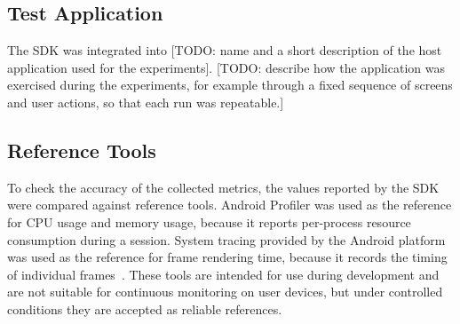 
\subsection{Test Application}

The SDK was integrated into [TODO: name and a short description of the host application used for the experiments]. [TODO: describe how the application was exercised during the experiments, for example through a fixed sequence of screens and user actions, so that each run was repeatable.]


\subsection{Reference Tools}

To check the accuracy of the collected metrics, the values reported by the SDK were compared against reference tools. Android Profiler was used as the reference for CPU usage and memory usage, because it reports per-process resource consumption during a session. %
System tracing provided by the Android platform was used as the reference for frame rendering time, because it records the timing of individual frames~\cite{AndroidTracing}. %
These tools are intended for use during development and are not suitable for continuous monitoring on user devices, but under controlled conditions they are accepted as reliable references.

